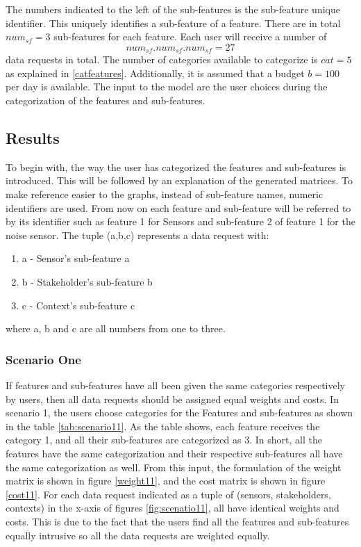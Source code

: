 The numbers indicated to the left of the sub-features is the sub-feature unique identifier. This uniquely identifies a sub-feature of a feature. There are in total $num_{sf}=3$ sub-features for each feature.
Each user will receive a number of $$num_{sf}.num_{sf}.num_{sf}=27$$ data requests in total. The number of categories available to categorize is $cat=5$ as explained in \ref{catfeatures}. Additionally, it is assumed that a budget $b=100$ per day is available. 
The input to the model are the user choices during the categorization of the features and sub-features.

\subsection{Results}

To begin with, the way the user has categorized the features and sub-features is introduced. This will be followed by an explanation
of the generated matrices. To make reference easier to the graphs, instead of sub-feature names, numeric identifiers are used. From now on each feature and sub-feature will be referred to by its identifier such as feature 1 for Sensors and sub-feature 2 of feature 1 for the noise sensor. The tuple (a,b,c) represents a data request with:
\begin{enumerate}
    \item a - Sensor's sub-feature a
    \item b - Stakeholder's sub-feature b
    \item c - Context's sub-feature c
   \end{enumerate}
where a, b and c are all numbers from one to three.

\subsubsection{Scenario One}

If features and sub-features have all been given the same categories respectively by users, then all data requests should be assigned equal weights and costs.
In scenario 1, the users choose categories for the Features and sub-features as shown in the table \ref{tab:scenario11}. As the table shows, each feature receives the 
category 1, and all their sub-features are categorized as 3. In short, all the features have the same categorization and their respective
sub-features all have the same categorization as well. From this input, the formulation of the weight matrix is shown in figure \ref{weight11}, and the cost matrix is shown in figure \ref{cost11}.
For each data request indicated as a tuple of (sensors, stakeholders, contexts) in the x-axis of figures \ref{fig:scenatio11}, all have identical weights and costs. This is due to the fact that the users find all the features and sub-features equally intrusive so all the data requests are weighted equally.

